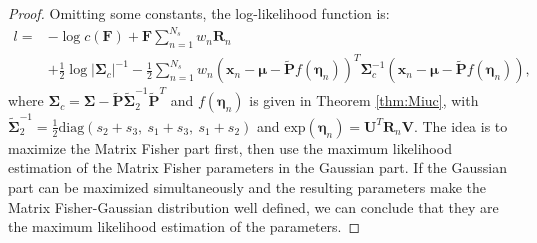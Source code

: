 \documentclass[12pt]{article}
\begin{document}
\begin{proof}
	Omitting some constants, the log-likelihood function is:
	\begin{equation}
		\begin{split}
			l = &-\log{c(\mathbf{F})} + \mathbf{F}\sum_{n=1}^{N_s}w_n\mathbf{R}_n \\
			&+\frac{1}{2}\log{|\mathbf{\Sigma}_c|^{-1}} - \frac{1}{2}\sum_{n=1}^{N_s}w_n\left(\bm{x}_n-\bm{\mu}-\tilde{\mathbf{P}}f(\bm{\eta}_n)\right)^T\mathbf{\Sigma}_c^{-1}\left(\bm{x}_n-\bm{\mu}-\tilde{\mathbf{P}}f(\bm{\eta}_n)\right),
		\end{split}
	\end{equation}
	where $\mathbf{\Sigma}_c = \mathbf{\Sigma}-\tilde{\mathbf{P}}\tilde{\mathbf{\Sigma}}_2^{-1}\tilde{\mathbf{P}}^T$ and $f(\bm{\eta}_n)$ is given in Theorem \ref{thm:Miuc}, with $\tilde{\mathbf{\Sigma}}_2^{-1} = \frac{1}{2}\mathrm{diag}(s_2+s_3,\ s_1+s_3,\ s_1+s_2)$ and $\mathrm{exp}(\bm{\eta}_n) = \mathbf{U}^T\mathbf{R}_n\mathbf{V}$.
	The idea is to maximize the Matrix Fisher part first, then use the maximum likelihood estimation of the Matrix Fisher parameters in the Gaussian part.
	If the Gaussian part can be maximized simultaneously and the resulting parameters make the Matrix Fisher-Gaussian distribution well defined, we can conclude that they are the maximum likelihood estimation of the parameters.
	

\end{proof}
\end{document}
